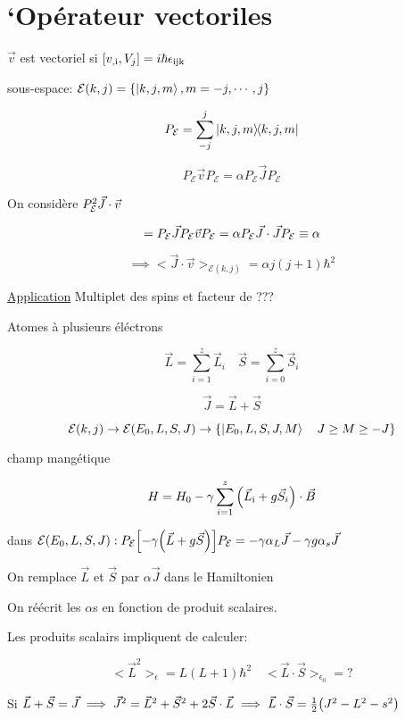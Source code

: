 



\section*{`Opérateur vectoriles}

$\vec v$ est vectoriel si $[v_{\rm, i}, V_j] = i\hbar\epsilon_{\rm ijk}$ 

sous-espace: $\mathcal E (k,j) = \{\ket{k,j,m}, m = -j,\dotsb,j\}$ 


$$P_\mathcal{E} = \sum_{-j}^j \ketbra{k,j,m}$$ 

$$\boxed{P_\mathcal E \vec v P_\mathcal E = \alpha P_\mathcal E \vec J P_\mathcal E}$$ 
	
On considère $P_{\rm \mathcal{E} }^2 \vec J \cdot \vec v$

$$ = P_{\rm \mathcal{E} } \vec J P_{\rm \mathcal{E} } \vec v P_{\rm \mathcal{E} } = \alpha P_{\rm \mathcal{E} } \vec J\cdot \vec J P_{\rm \mathcal{E} } \equiv \alpha$$

$$\implies <\vec J \cdot \vec v>_{\mathcal{E}(k,j)} = \alpha j(j+1)\hbar^2$$

\underline{Application} Multiplet des spins et facteur de ???

Atomes à plusieurs éléctrons

$$\vec L = \sum_{i=1}^z \vec L_i\quad \vec S = \sum_{i=0}^{z}\vec S_i$$ 

$$\vec J = \vec L + \vec S$$ 

$$\mathcal{E}(k,j) \to \mathcal{E} (E_0, L, S, J) \to \{\ket{E_0, L, S, J, M}\quad J \geq M \geq -J\}$$ 

champ mangétique

$$H = H_0 - \gamma \sum_{i=1}^z\qty(\vec L_{\rm i}+ g\vec S_i) \cdot \vec B$$ 

dans $\mathcal{E} (E_0, L, S, J) :P_{\rm \mathcal{E} }\qty[-\gamma\qty(\vec L +g\vec S)]P_{\rm \mathcal{E}} = -\gamma\alpha_L\vec J-\gamma g \alpha_s\vec J$ 

On remplace $\vec L$ et $\vec S$ par $\alpha \vec J$ dans le Hamiltonien  

On réécrit les $\alpha$s en fonction de produit scalaires.

Les produits scalairs impliquent de calculer:

$$<\vec L ^2>_\epsilon = L(L+1)\hbar^2 \quad <\vec L \cdot \vec S>_{\epsilon_0} = ?$$

Si $\vec L + \vec S = \vec J \implies \vec J ^2 = \vec L^2 + \vec S^2 + 2\vec S \cdot \vec L \implies \vec L \cdot \vec S = \frac{1}{2} \qty(J^2 - L^2 - s^2)$ 


